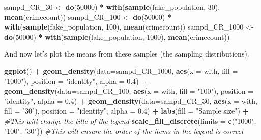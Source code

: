 \documentclass[
]{book}
\newenvironment{Shaded}{\begin{snugshade}}{\end{snugshade}}
\newcommand{\AttributeTok}[1]{\textcolor[rgb]{0.13,0.29,0.53}{#1}}
\newcommand{\CommentTok}[1]{\textcolor[rgb]{0.56,0.35,0.01}{\textit{#1}}}
\newcommand{\DecValTok}[1]{\textcolor[rgb]{0.00,0.00,0.81}{#1}}
\newcommand{\FloatTok}[1]{\textcolor[rgb]{0.00,0.00,0.81}{#1}}
\newcommand{\FunctionTok}[1]{\textcolor[rgb]{0.13,0.29,0.53}{\textbf{#1}}}
\newcommand{\NormalTok}[1]{#1}
\newcommand{\OtherTok}[1]{\textcolor[rgb]{0.56,0.35,0.01}{#1}}
\newcommand{\SpecialCharTok}[1]{\textcolor[rgb]{0.81,0.36,0.00}{\textbf{#1}}}
\newcommand{\StringTok}[1]{\textcolor[rgb]{0.31,0.60,0.02}{#1}}
\begin{document}
\begin{Shaded}
\begin{Highlighting}[]
\NormalTok{sampd\_CR\_30 }\OtherTok{\textless{}{-}} \FunctionTok{do}\NormalTok{(}\DecValTok{50000}\NormalTok{) }\SpecialCharTok{*} \FunctionTok{with}\NormalTok{(}\FunctionTok{sample}\NormalTok{(fake\_population, }\DecValTok{30}\NormalTok{), }\FunctionTok{mean}\NormalTok{(crimecount))}
\NormalTok{sampd\_CR\_100 }\OtherTok{\textless{}{-}} \FunctionTok{do}\NormalTok{(}\DecValTok{50000}\NormalTok{) }\SpecialCharTok{*} \FunctionTok{with}\NormalTok{(}\FunctionTok{sample}\NormalTok{(fake\_population, }\DecValTok{100}\NormalTok{), }\FunctionTok{mean}\NormalTok{(crimecount))}
\NormalTok{sampd\_CR\_1000 }\OtherTok{\textless{}{-}} \FunctionTok{do}\NormalTok{(}\DecValTok{50000}\NormalTok{) }\SpecialCharTok{*} \FunctionTok{with}\NormalTok{(}\FunctionTok{sample}\NormalTok{(fake\_population, }\DecValTok{1000}\NormalTok{), }\FunctionTok{mean}\NormalTok{(crimecount))}
\end{Highlighting}
\end{Shaded}

And now let's plot the means from these samples (the sampling distributions).

\begin{Shaded}
\begin{Highlighting}[]
\FunctionTok{ggplot}\NormalTok{() }\SpecialCharTok{+} 
  \FunctionTok{geom\_density}\NormalTok{(}\AttributeTok{data=}\NormalTok{sampd\_CR\_1000, }\FunctionTok{aes}\NormalTok{(}\AttributeTok{x =}\NormalTok{ with, }\AttributeTok{fill =} \StringTok{"1000"}\NormalTok{), }\AttributeTok{position =} \StringTok{"identity"}\NormalTok{, }\AttributeTok{alpha =} \FloatTok{0.4}\NormalTok{) }\SpecialCharTok{+}
   \FunctionTok{geom\_density}\NormalTok{(}\AttributeTok{data=}\NormalTok{sampd\_CR\_100, }\FunctionTok{aes}\NormalTok{(}\AttributeTok{x =}\NormalTok{ with, }\AttributeTok{fill =} \StringTok{"100"}\NormalTok{), }\AttributeTok{position =} \StringTok{"identity"}\NormalTok{, }\AttributeTok{alpha =} \FloatTok{0.4}\NormalTok{) }\SpecialCharTok{+}
   \FunctionTok{geom\_density}\NormalTok{(}\AttributeTok{data=}\NormalTok{sampd\_CR\_30, }\FunctionTok{aes}\NormalTok{(}\AttributeTok{x =}\NormalTok{ with, }\AttributeTok{fill =} \StringTok{"30"}\NormalTok{), }\AttributeTok{position =} \StringTok{"identity"}\NormalTok{, }\AttributeTok{alpha =} \FloatTok{0.4}\NormalTok{) }\SpecialCharTok{+}
  \FunctionTok{labs}\NormalTok{(}\AttributeTok{fill =} \StringTok{"Sample size"}\NormalTok{) }\SpecialCharTok{+} \CommentTok{\#This will change the title of the legend}
  \FunctionTok{scale\_fill\_discrete}\NormalTok{(}\AttributeTok{limits =} \FunctionTok{c}\NormalTok{(}\StringTok{"1000"}\NormalTok{, }\StringTok{"100"}\NormalTok{, }\StringTok{"30"}\NormalTok{)) }\CommentTok{\#This will ensure the order of the items in the legend is correct}
\end{Highlighting}
\end{Shaded}
\end{document}
